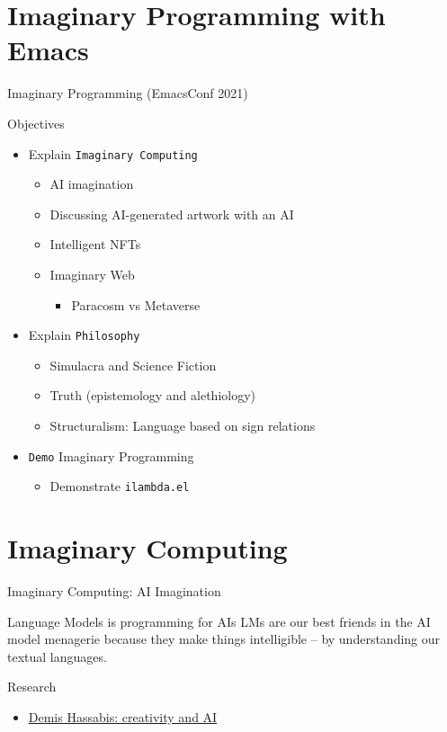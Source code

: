 \documentclass[presentation]{beamer}
\begin{document}
\section{Imaginary Programming with Emacs}
\label{sec:orge6fbe92}
\begin{frame}[label={sec:orgeb02210},fragile]{Imaginary Programming (EmacsConf 2021)}
 \begin{block}{Objectives}
\begin{itemize}
\item Explain \texttt{Imaginary Computing}
\begin{itemize}
\item AI imagination
\item Discussing AI-generated artwork with an AI
\item Intelligent NFTs
\item Imaginary Web
\begin{itemize}
\item Paracosm vs Metaverse
\end{itemize}
\end{itemize}
\item Explain \texttt{Philosophy}
\begin{itemize}
\item Simulacra and Science Fiction
\item Truth (epistemology and alethiology)
\item Structuralism: Language based on sign relations
\end{itemize}
\item \texttt{Demo} Imaginary Programming
\begin{itemize}
\item Demonstrate \texttt{ilambda.el}
\end{itemize}
\end{itemize}
\end{block}
\end{frame}

\section{Imaginary Computing}
\label{sec:org6df6968}
\begin{frame}[label={sec:org1e14545}]{Imaginary Computing: AI Imagination}
\begin{block}{Language Models is programming for AIs}
LMs are our best friends in the AI model
menagerie because they make things
intelligible -- by understanding our textual
languages.
\end{block}

\begin{block}{Research}
\begin{itemize}
\item \href{https://www.youtube.com/watch?v=d-bvsJWmqlc}{Demis Hassabis: creativity and AI}
\end{itemize}
\end{block}
\end{frame}
\end{document}
